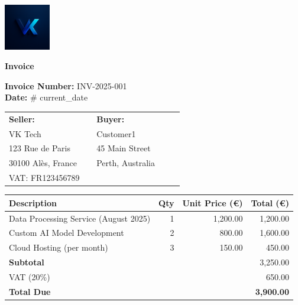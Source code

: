 \documentclass[a4paper,12pt]{article}
\begin{document}
\noindent
\begin{minipage}{0.15\linewidth}
    \includegraphics[height=20mm]{smartinvoice/resources/latex_resources/vk_logo.png}
\end{minipage}%
\hfill
\begin{minipage}{0.85\linewidth}
    \begin{center}
        {\Huge \textbf{Invoice}}
    \end{center}
\end{minipage}



\vspace{0.8cm}


\noindent
\textbf{Invoice Number:} INV-2025-001 \\
\textbf{Date:} \#{{ current_date }} \\[0.5cm]

\vspace{0.4cm}

\noindent
\begin{tabular}{p{0.45\linewidth} p{0.45\linewidth}}
\textbf{Seller:} & \textbf{Buyer:} \\
VK Tech & Customer1 \\
123 Rue de Paris & 45 Main Street \\
30100 Alès, France & Perth, Australia \\
VAT: FR123456789 &  \\
\end{tabular}

\vspace{0.8cm}

\renewcommand{\arraystretch}{1.4}
\begin{longtable}{p{7cm}r r r}
\toprule
\textbf{Description} & \textbf{Qty} & \textbf{Unit Price (€)} & \textbf{Total (€)} \\
\midrule
Data Processing Service (August 2025) & 1 & 1,200.00 & 1,200.00 \\
Custom AI Model Development & 2 & 800.00 & 1,600.00 \\
Cloud Hosting (per month) & 3 & 150.00 & 450.00 \\
\textbf{Subtotal} & & & 3,250.00 \\
VAT (20\%) & & & 650.00 \\
\textbf{Total Due} & & & \textbf{3,900.00} \\
\bottomrule
\end{longtable}
\end{document}
